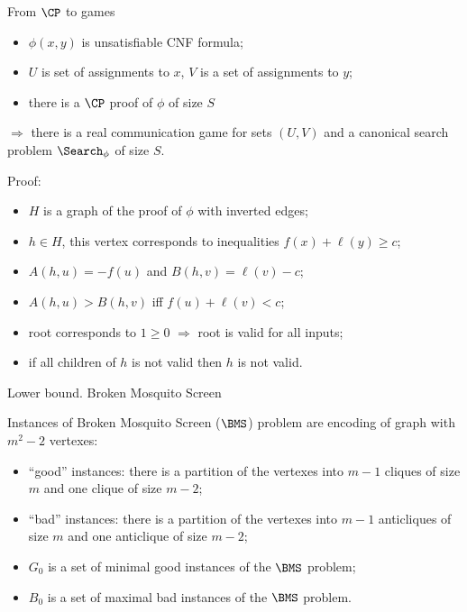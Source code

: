 \begin{frame}{From $\CP$ to games}

    \begin{lemma}
        \begin{itemize}
            \item $\phi(x, y)$ is unsatisfiable CNF formula;
            \item $U$ is set of assignments to $x$, $V$ is a set of assignments to $y$;
            \item there is a $\CP$ proof of $\phi$ of size $S$
        \end{itemize}
        $\Rightarrow$ there is a real communication game for sets $(U, V)$ and a canonical search problem $\Search_{\phi}$ of
        size $S$. 
    \end{lemma}

    \pause
    Proof:
    \pause
    \begin{itemize}
        \item $H$ is a graph of the proof of $\phi$ with inverted edges;
        \pause
        \item $h \in H$, this vertex corresponds to inequalities $f(x) + \ell(y) \ge c$;
        \pause
        \item $A(h, u) = -f(u)$ and $B(h, v) = \ell(v) - c$;
        \pause    
        \item $A(h, u) > B(h, v)$ iff $f(u) + \ell(v) < c$;
        \pause
        \item root corresponds to $1 \ge 0$ $\Rightarrow$ root is valid for all inputs;
        \pause
        \item if all children of $h$ is not valid then $h$ is not valid.
    \end{itemize}
\end{frame}

\begin{frame}{Lower bound. Broken Mosquito Screen}

    Instances of Broken Mosquito Screen ($\BMS$) problem are encoding of graph with $m^2 - 2$ vertexes:
    \begin{itemize}
        \pause
        \item ``good'' instances: there is a partition of the vertexes into $m - 1$ cliques of size $m$ and one clique of size
            $m - 2$;
        \pause
		\item ``bad'' instances: there is a partition of the vertexes into $m - 1$ anticliques of size $m$ and one anticlique
            of size $m - 2$;
        \pause
        \item $G_0$ is a set of minimal good instances of the $\BMS$ problem;
        \pause
        \item $B_0$ is a set of maximal bad instances of the $\BMS$ problem.
    \end{itemize}

\end{frame}

